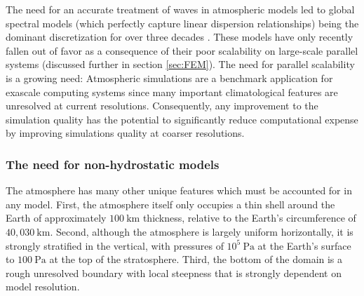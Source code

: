 \documentclass[11pt]{article}
\begin{document}

The need for an accurate treatment of waves in atmospheric models led to global spectral models (which perfectly capture linear dispersion relationships) being the dominant discretization for over three decades \cite{bourke1972efficient, gordon1982description, barros1995ifs}.  These models have only recently fallen out of favor as a consequence of their poor scalability on large-scale parallel systems (discussed further in section \ref{sec:FEM}).  The need for parallel scalability is a growing need:  Atmospheric simulations are a benchmark application for exascale computing systems since many important climatological features are unresolved at current resolutions.  Consequently, any improvement to the simulation quality has the potential to significantly reduce computational expense by improving simulations quality at coarser resolutions.

\subsubsection{The need for non-hydrostatic models} \label{sec:UniqueAtmosphere}

The atmosphere has many other unique features which must be accounted for in any model.  First, the atmosphere itself only occupies a thin shell around the Earth of approximately $100\ \mbox{km}$ thickness, relative to the Earth's circumference of $40,030\ \mbox{km}$.  Second, although the atmosphere is largely uniform horizontally, it is strongly stratified in the vertical, with pressures of $10^5\ \mbox{Pa}$ at the Earth's surface to $100\ \mbox{Pa}$ at the top of the stratosphere.  Third, the bottom of the domain is a rough unresolved boundary with local steepness that is strongly dependent on model resolution.
\end{document}
